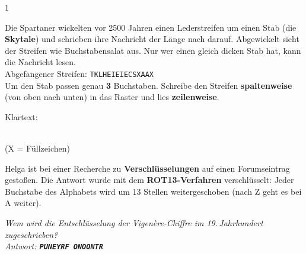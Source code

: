 \documentclass[11pt,a4paper]{article}
\begin{document}

\begin{aufgabe}{1}
\begin{minipage}[t]{0.58\linewidth}
\vspace{0pt}
Die Spartaner wickelten vor 2500 Jahren einen Lederstreifen um einen Stab (die \textbf{Skytale}) und schrieben ihre Nachricht der Länge nach darauf. Abgewickelt sieht der Streifen wie Buchstabensalat aus. Nur wer einen gleich dicken Stab hat, kann die Nachricht lesen.\\[1mm]
Abgefangener Streifen: \quad\texttt{\large TKLHEIEIECSXAAX}\\[1mm]
Um den Stab passen genau \textbf{3} Buchstaben. Schreibe den Streifen \textbf{spaltenweise} (von oben nach unten) in das Raster und lies \textbf{zeilenweise}.\par
{\lueckentext Klartext: \par}
\end{minipage}\hfill
\begin{minipage}[t]{0.38\linewidth}
\vspace{2mm}\centering
{}\\[1mm]
{\small (X = Füllzeichen)}
\end{minipage}
\end{aufgabe}

\begin{minipage}[t]{0.63\linewidth}
\vspace{0pt}
Helga ist bei einer Recherche zu \textbf{Verschlüsselungen} auf einen Forumseintrag gestoßen. Die Antwort wurde mit dem \textbf{ROT13-Verfahren} verschlüsselt: Jeder Buchstabe des Alphabets wird um 13 Stellen weitergeschoben (nach Z geht es bei A weiter).
\end{minipage}\hfill
\begin{minipage}[t]{0.33\linewidth}
\vspace{0pt}
\begin{tcolorbox}[colback=yellow!15,colframe=orange!60,boxrule=0.5pt,arc=1mm,left=1.5mm,right=1.5mm,top=1mm,bottom=1mm]
\small\itshape Wem wird die Entschlüsselung der Vigenère-Chiffre im 19.\,Jahrhundert zugeschrieben?\\[0.5mm]
\upshape Antwort: \texttt{\bfseries PUNEYRF ONOONTR}
\end{tcolorbox}
\end{minipage}
\end{document}
